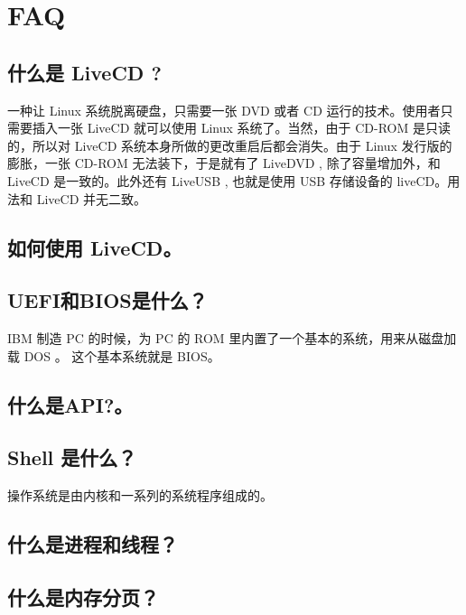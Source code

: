 \renewcommand{\thesection}{\arabic{section}}

\chapter{FAQ}\label{chap:FAQ}

\section{什么是 LiveCD ?}\label{FAQ:LiveCD}
一种让 Linux 系统脱离硬盘，只需要一张 DVD 或者 CD 运行的技术。使用者只需要插入一张 LiveCD 就可以使用 Linux  系统了。当然，由于 CD-ROM 是只读的，所以对 LiveCD 系统本身所做的更改重启后都会消失。由于 Linux 发行版的膨胀，一张 CD-ROM 无法装下，于是就有了 LiveDVD , 除了容量增加外，和LiveCD 是一致的。此外还有 LiveUSB , 也就是使用 USB 存储设备的 liveCD。用法和 LiveCD 并无二致。

\section{如何使用 LiveCD。}\label{FAQ:UseLiveCD}

\section{UEFI和BIOS是什么？}

IBM 制造 PC 的时候，为 PC 的 ROM 里内置了一个基本的系统，用来从磁盘加载 DOS 。 这个基本系统就是 BIOS。



\section{什么是API?。}\label{FAQ:API}

\section{Shell 是什么？}
操作系统是由内核和一系列的系统程序组成的。

\section{什么是进程和线程？}\label{FAQ:Process}

\section{什么是内存分页？}\label{FAQ:Paging}

